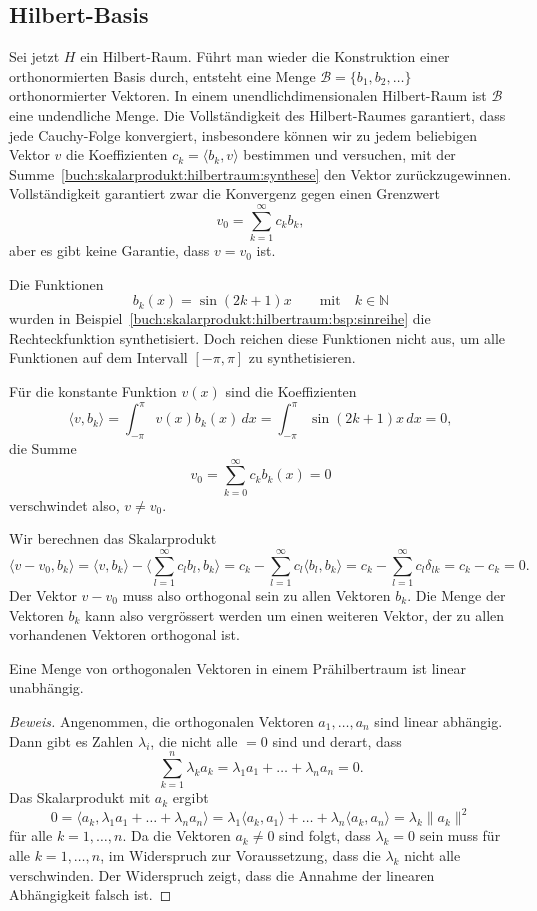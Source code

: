 %
%
\subsection{Hilbert-Basis}
Sei jetzt $H$ ein Hilbert-Raum.
Führt man wieder die Konstruktion einer orthonormierten Basis durch,
entsteht eine Menge $\mathcal{B}=\{b_1,b_2,\dots\}$ orthonormierter
Vektoren.
In einem unendlichdimensionalen Hilbert-Raum ist $\mathcal{B}$ eine
undendliche Menge.
Die Vollständigkeit des Hilbert-Raumes garantiert, dass jede
Cauchy-Folge konvergiert, insbesondere können wir zu jedem beliebigen
Vektor $v$ die Koeffizienten $c_k=\langle b_k,v \rangle$ bestimmen
und versuchen, mit der
Summe~\eqref{buch:skalarprodukt:hilbertraum:synthese}
den Vektor zurückzugewinnen.
Vollständigkeit garantiert zwar die Konvergenz gegen einen Grenzwert
\[
v_0 = \sum_{k=1}^\infty c_k b_k,
\]
aber es gibt keine Garantie, dass $v=v_0$ ist.

\begin{beispiel}
Die Funktionen
\[
b_k(x) = \sin (2k+1)x
\qquad\text{mit}\quad
k\in \mathbb{N}
\]
wurden in Beispiel~\ref{buch:skalarprodukt:hilbertraum:bsp:sinreihe}
die Rechteckfunktion synthetisiert.
Doch reichen diese Funktionen nicht aus, um alle Funktionen auf
dem Intervall $[-\pi,\pi]$ zu synthetisieren.

Für die konstante Funktion $v(x)$ sind die Koeffizienten
\[
\langle v,b_k\rangle
=
\int_{-\pi}^\pi v(x)b_k(x)\,dx
=
\int_{-\pi}^\pi \sin (2k+1)x\,dx
=
0,
\]
die Summe
\[
v_0
=
\sum_{k=0}^\infty
c_k
b_k(x)
=
0
\]
verschwindet also, $v\ne v_0$.
\end{beispiel}

Wir berechnen das Skalarprodukt 
\[
\langle v-v_0,b_k\rangle
=
\langle v,b_k\rangle
-
\biggl\langle \sum_{l=1}^\infty c_lb_l,b_k\biggr\rangle
=
c_k - \sum_{l=1}^\infty c_l\langle b_l,b_k\rangle
=
c_k - \sum_{l=1}^\infty c_l\delta_{lk}
=
c_k-c_k=0.
\]
Der Vektor $v-v_0$ muss also orthogonal sein zu allen Vektoren
$b_k$.
Die Menge der Vektoren $b_k$ kann also vergrössert werden um einen
weiteren Vektor, der zu allen vorhandenen Vektoren orthogonal ist.

\begin{satz}
Eine Menge von orthogonalen Vektoren in einem Prähilbertraum ist linear 
unabhängig.
\end{satz}

\begin{proof}[Beweis]
Angenommen, die orthogonalen Vektoren  $a_1,\dots,a_n$ sind linear
abhängig.
Dann gibt es Zahlen $\lambda_i$, die nicht alle $=0$ sind und derart,
dass
\[
\sum_{k=1}^n \lambda_ka_k
=
\lambda_1 a_1 + \ldots + \lambda_n a_n
=
0.
\]
Das Skalarprodukt mit $a_k$ ergibt
\[
0
=
\langle a_k,\lambda_1a_1 +\ldots + \lambda_na_n\rangle
=
\lambda_1
\langle a_k,a_1\rangle
+
\ldots
+
\lambda_n
\langle a_k,a_n\rangle
=
\lambda_k \|a_k\|^2
\]
für alle $k=1,\dots,n$.
Da die Vektoren $a_k\ne 0$ sind folgt, dass $\lambda_k=0$ sein muss
für alle $k=1,\dots,n$, im Widerspruch zur Voraussetzung, dass die
$\lambda_k$ nicht alle verschwinden.
Der Widerspruch zeigt, dass die Annahme der linearen Abhängigkeit
falsch ist.
\end{proof}

